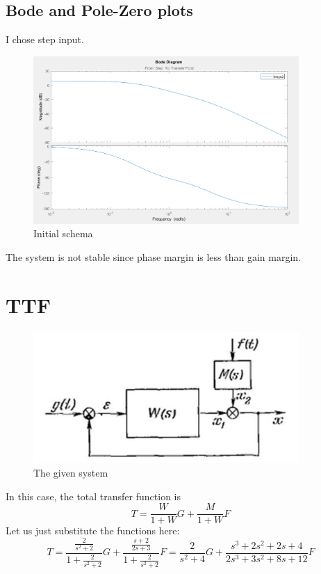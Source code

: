 \documentclass{article}
\begin{document}
\subsection{Bode and Pole-Zero plots}
I chose step input. 
\begin{figure}[H]
        \centering
        \includegraphics[width=0.9\textwidth]{sources/image2_10.png}
        \caption{Initial schema}
        \label{fig:bode1}
\end{figure}
The system is not stable since phase margin is less than gain margin.

\section{TTF}
\begin{figure}[H]
        \centering
        \includegraphics[width=0.9\textwidth]{sources/image3_1.png}
        \caption{The given system}
        \label{fig:bode1}
\end{figure}
In this case, the total transfer function is 
\begin{equation}
	T = \frac{W}{1+W}G + \frac{M}{1+W}F
\end{equation}
Let us just substitute the functions here:
\begin{equation}
	T = \frac{\frac{2}{s^2 + 2}}{1 + \frac{2}{s^2+2}} G + \frac{\frac{s + 2}{2s + 3}}{1 + \frac{2}{s^2 + 2}} F = 
	\frac{2}{s^2 + 4} G + \frac{s^3 + 2s^2 + 2s + 4}{2s^3 + 3s^2 + 8s + 12} F
\end{equation}
\end{document}
